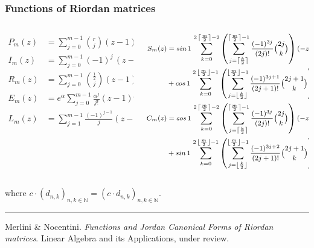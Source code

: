 \documentclass[9pt]{beamer}
\begin{document}
\begin{frame}[fragile]
\frametitle{Functions of Riordan matrices}
\begin{columns}
    \begin{column}{0.35\textwidth}
        \begin{displaymath}
        \begin{split}
          P_{m}(z) &= \sum_{j=0}^{m-1}{\binom{r}{j}}{(z-1)^{j} }\\
          I_{m}(z) &= \sum_{j=0}^{m-1}{(-1)^{j}\,\left(z-1\right)^{j}}\\
          R_{m}(z) &= \sum_{j=0}^{m-1}{{\frac{1}{2} \choose j}\left(z-1\right)^{j}}\\
          E_{m}(z) &= e^{\alpha} \sum_{j=0}^{m-1}{\frac{\alpha^{j}}{j!}\left(z-1\right)^{j}}\\
          L_{m}(z) &= \sum_{j=1}^{m-1}{\frac{(-1)^{j-1}}{j}{\left(z-1\right)^{j} }}\\
        \end{split}
        \end{displaymath}
    \end{column}
    \vrule{}
    \begin{column}{0.65\textwidth}
        \begin{displaymath}
        \footnotesize
        \begin{split}
          S_{m}(z)  &= sin\,{1}\,\sum_{k=0}^{2\,\left\lceil \frac{m}{2} \right\rceil-2}{\left(\sum_{j=\left\lceil \frac{k}{2}\right\rceil}^{\left\lceil \frac{m}{2} \right\rceil -1}{\frac{(-1)^{3j}}{(2j)!}{2j\choose k}}\right) {(-z)^{k}}}\\
                    &+ cos\,{1}\,\sum_{k=0}^{2\,\left\lfloor \frac{m}{2} \right\rfloor-1}{\left(\sum_{j=\left\lfloor \frac{k}{2}\right\rfloor}^{\left\lfloor \frac{m}{2} \right\rfloor -1}{\frac{(-1)^{3j+1}}{(2j + 1)!} {2j+1\choose k}}\right){(-z)^{k}}}\\
          C_{m}(z)  &= cos\,{1}\,\sum_{k=0}^{2\,\left\lceil \frac{m}{2} \right\rceil-2}{\left(\sum_{j=\left\lceil \frac{k}{2}\right\rceil}^{\left\lceil \frac{m}{2} \right\rceil -1}{\frac{(-1)^{3j}}{(2j)!}{2j\choose k}}\right) {(-z)^{k}}}\\
                    &+ sin\,{1}\,\sum_{k=0}^{2\,\left\lfloor \frac{m}{2} \right\rfloor-1}{\left(\sum_{j=\left\lfloor \frac{k}{2}\right\rfloor}^{\left\lfloor \frac{m}{2} \right\rfloor -1}{\frac{(-1)^{3j+2}}{(2j + 1)!} {2j+1\choose k}}\right){(-z)^{k}}}\\
        \end{split}
        \end{displaymath}
    \end{column}
\end{columns}
where $c\cdot(d_{n,k})_{n,k\in\mathbb{N}} = (c\cdot d_{n,k})_{n,k\in\mathbb{N}}$.
\vfill
\noindent\rule{\textwidth}{0.1pt}
{\footnotesize
Merlini \& Nocentini. \textit{Functions and Jordan Canonical Forms of Riordan
matrices}. \newline Linear Algebra and its Applications, under review.}
\end{frame}
\end{document}
